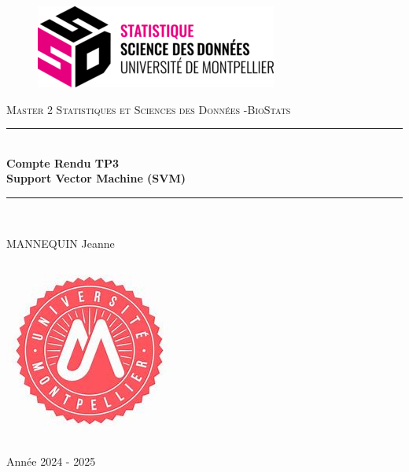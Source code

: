 \documentclass[11pt,a4paper]{article}
\author{Mannequin Jeanne}
\date{01/10/2024}
\begin{document}
\begin{titlepage}

\newcommand{\HRule}{\rule{\linewidth}{0.5mm}}
\center 


\begin{figure}
    \centering
    \includegraphics[width=0.5\linewidth]{ssd_logo_couleur_noir-300x103.png}
\end{figure}



\textsc{\Large Master 2 Statistiques et Sciences des Données -BioStats}\\[1cm] %
\HRule \\[0.4cm]
{ \huge \bfseries Compte Rendu TP3 \\ Support Vector Machine (SVM)}\\[0.4cm]
\HRule \\[1.5cm]
\vspace{10cm}
\begin{center}
\begin{Large}
MANNEQUIN Jeanne \\
\end{Large}
\end{center}
    

\begin{center}
\vfill{\includegraphics[width=0.1\linewidth]{MONTPELLIER.jpg}\vspace{0.5cm}\\
\begin{Large} Année 2024 - 2025 \\
\end{Large}}



\end{center}

\end{titlepage}

\pagebreak

\tableofcontents
\pagebreak
\end{document}
